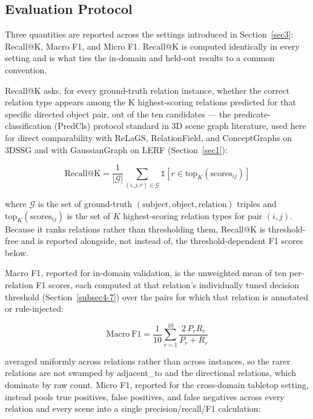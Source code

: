 \documentclass[sn-mathphys,Numbered]{sn-jnl}
\begin{document}
\FloatBarrier
\subsection{Evaluation Protocol}\label{subsec4-9}

Three quantities are reported across the settings introduced in Section~\ref{sec3}: Recall@K, Macro F1, and Micro F1. Recall@K is computed identically in every setting and is what ties the in-domain and held-out results to a common convention.

Recall@K asks, for every ground-truth relation instance, whether the correct relation type appears among the K highest-scoring relations predicted for that specific directed object pair, out of the ten candidates --- the predicate-classification (PredCls) protocol standard in 3D scene graph literature, used here for direct comparability with ReLaGS, RelationField, and ConceptGraphs on 3DSSG and with GaussianGraph on LERF (Section~\ref{sec1}):

\begin{equation}
\mathrm{Recall@K} = \frac{1}{|\mathcal{G}|} \sum_{(i,j,r) \in \mathcal{G}} \mathbb{1}\!\left[r \in \mathrm{top}_K\!\left(\mathrm{scores}_{ij}\right)\right]
\label{eq:recallk}
\end{equation}

where $\mathcal{G}$ is the set of ground-truth $(\text{subject}, \text{object}, \text{relation})$ triples and $\mathrm{top}_K(\mathrm{scores}_{ij})$ is the set of $K$ highest-scoring relation types for pair $(i,j)$. Because it ranks relations rather than thresholding them, Recall@K is threshold-free and is reported alongside, not instead of, the threshold-dependent F1 scores below.

Macro F1, reported for in-domain validation, is the unweighted mean of ten per-relation F1 scores, each computed at that relation's individually tuned decision threshold (Section~\ref{subsec4-7}) over the pairs for which that relation is annotated or rule-injected:

\begin{equation}
\mathrm{Macro\ F1} = \frac{1}{10} \sum_{r=1}^{10} \frac{2\,P_r R_r}{P_r + R_r}
\label{eq:macrof1}
\end{equation}

averaged uniformly across relations rather than across instances, so the rarer relations are not swamped by adjacent\_to and the directional relations, which dominate by raw count. Micro F1, reported for the cross-domain tabletop setting, instead pools true positives, false positives, and false negatives across every relation and every scene into a single precision/recall/F1 calculation:
\end{document}
